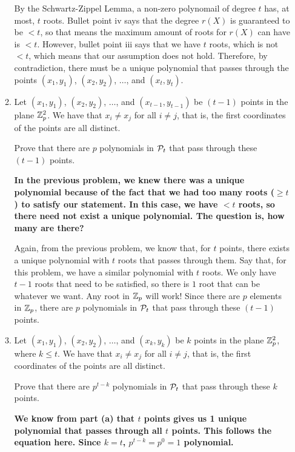 \documentclass[11pt]{article}
\begin{document}
\begin{enumerate}
\begin{enumerate}
{      By the Schwartz-Zippel Lemma, a non-zero polynomail of degree $t$ has, at most, $t$ roots. Bullet point iv says that the degree $r(X)$ is guaranteed to be $< t$, so that means the maximum amount of roots for $r(X)$ can have is $<t$. However, bullet point iii says that we have $t$ roots, which is not $<t$, which means that our assumption does not hold. Therefore, by contradiction, there must be a unique polynomial that passes through the points $(x_1,y_1)$, $(x_2,y_2)$, $\dotsc$, and $(x_t,y_t)$.
    }
     \newpage
  \item Let $(x_1,y_1)$, $(x_2,y_2)$, $\dotsc$, and $(x_{t-1},y_{t-1})$ be $(t-1)$ points in the plane ${\mathbb Z}_p^2$.
    We have that $x_i \neq x_j$ for all $i\neq j$, that is, the first coordinates of the points are all distinct.
    
    Prove that there are $p$ polynomials in ${\mathcal P}_t$ that pass through these $(t-1)$ points. \newline 
    {\bfseries
    \newline
    \newline
      In the previous problem, we knew there was a unique polynomial because of the fact that we had too many roots ($\geq t$) to satisfy  our statement. In this case, we have $<t$ roots, so there need not exist a unique polynomial. The question is, how many are there? \newline

      Again, from the previous problem, we know that, for $t$ points, there exists a unique polynomial with $t$ roots that passes through them. Say that, for this problem, we have a similar polynomial with $t$ roots. We only have $t-1$ roots that need to be satisfied, so there is $1$ root that can be whatever we want. Any root in ${\mathbb Z}_p$ will work! Since there are $p$ elements in ${\mathbb Z}_p$, there are $p$ polynomials in ${\mathcal P}_t$ that pass through these $(t-1)$ points.
    }
     \newpage
  \item Let  $(x_1,y_1)$, $(x_2,y_2)$, $\dotsc$, and $(x_k,y_k)$ be $k$ points in the plane ${\mathbb Z}_p^2$, where $k\leq t$. 
    We have that $x_i \neq x_j$ for all $i\neq j$, that is, the first coordinates of the points are all distinct.
    
    Prove that there are $p^{t-k}$ polynomials in ${\mathcal P}_t$ that pass through these $k$ points. \newline 
    {\bfseries
    \newline
    \newline
      We know from part (a) that $t$ points gives us 1 unique polynomial that passes through all $t$ points. This follows the equation here. Since $k=t$, $p^{t-k}=p^0=1$ polynomial. \newline

}
\end{enumerate}
\end{enumerate}
\end{document}
